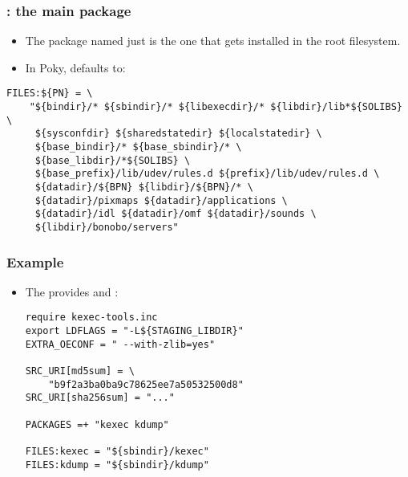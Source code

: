 \begin{frame}[fragile]
  \frametitle{: the main package}
  \begin{itemize}
    \item The package named just  is the one that gets
      installed in the root filesystem.
    \item In Poky, defaults to:
  \end{itemize}
  \begin{block}{}
    \begin{verbatim}
FILES:${PN} = \
    "${bindir}/* ${sbindir}/* ${libexecdir}/* ${libdir}/lib*${SOLIBS} \
     ${sysconfdir} ${sharedstatedir} ${localstatedir} \
     ${base_bindir}/* ${base_sbindir}/* \
     ${base_libdir}/*${SOLIBS} \
     ${base_prefix}/lib/udev/rules.d ${prefix}/lib/udev/rules.d \
     ${datadir}/${BPN} ${libdir}/${BPN}/* \
     ${datadir}/pixmaps ${datadir}/applications \
     ${datadir}/idl ${datadir}/omf ${datadir}/sounds \
     ${libdir}/bonobo/servers"
    \end{verbatim}
  \end{block}
\end{frame}

\begin{frame}[fragile]
  \frametitle{Example}
  \begin{itemize}
    \item The \code{kexec tools} provides \code{kexec} and :
    \begin{block}{}
    \begin{verbatim}
require kexec-tools.inc
export LDFLAGS = "-L${STAGING_LIBDIR}"
EXTRA_OECONF = " --with-zlib=yes"

SRC_URI[md5sum] = \
    "b9f2a3ba0ba9c78625ee7a50532500d8"
SRC_URI[sha256sum] = "..."

PACKAGES =+ "kexec kdump"

FILES:kexec = "${sbindir}/kexec"
FILES:kdump = "${sbindir}/kdump"
    \end{verbatim}
    \end{block}
  \end{itemize}
\end{frame}


